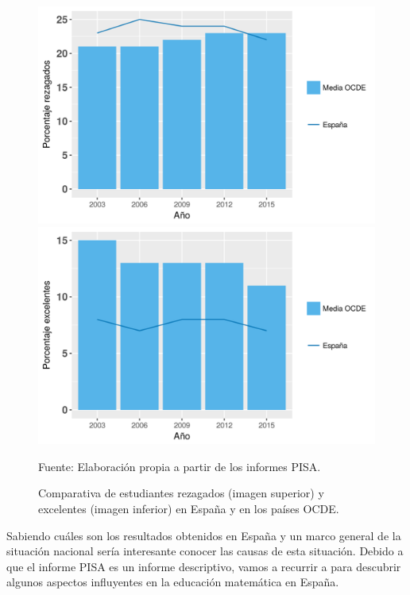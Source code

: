 \begin{figure}[hbt]
\begin{center}
\includegraphics[scale=0.62]{img/PisaRezagados.png}
\includegraphics[scale=0.62]{img/PisaExcelentes.png}
\caption{Comparativa de estudiantes rezagados (imagen superior) y excelentes (imagen inferior) en España y en los países OCDE. }
\label{fig::PisaRezEx}
\end{center}
\vspace{-0.5cm}
\small{Fuente: Elaboración propia a partir de los informes PISA.}
\end{figure}
\FloatBarrier

Sabiendo cuáles son los resultados obtenidos en España y un marco general de la situación nacional sería interesante conocer las causas de esta situación.
%
Debido a que el informe PISA es un informe descriptivo, vamos a recurrir a \cite{ActitudesHaciaMates} para descubrir algunos aspectos influyentes en la educación matemática en España.


